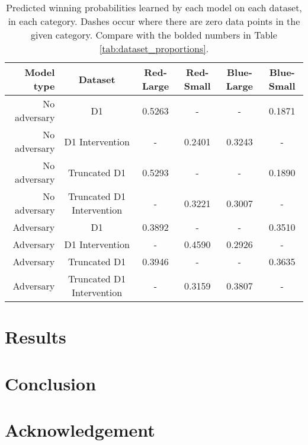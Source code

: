 \documentclass{article}
\begin{document}
\begin{table*} %
\centering
\begin{tabular}{r | c | c | c | c | c}
 Model type & Dataset & Red-Large & Red-Small & Blue-Large & Blue-Small \\
 \hline
No adversary & D1 & 0.5263 & - & - & 0.1871 \\
No adversary  & D1 Intervention & - & 0.2401 & 0.3243 & - \\
No adversary  & Truncated D1 & 0.5293 & - & - & 0.1890 \\
No adversary  & Truncated D1 Intervention & - & 0.3221 & 0.3007 & - \\
\hline
Adversary & D1 & 0.3892 & - & - & 0.3510 \\
Adversary  & D1 Intervention & - & 0.4590 & 0.2926 & - \\
Adversary  & Truncated D1 & 0.3946 & - & - & 0.3635 \\
Adversary  & Truncated D1 Intervention & - & 0.3159 & 0.3807 & -
\end{tabular}
\caption{Predicted winning probabilities learned by each model on each dataset, in each category. Dashes occur where there are zero data points in the given category. Compare with the bolded numbers in Table \ref{tab:dataset_proportions}.}
\label{tab:model_performance}
\end{table*}



\section{Results}










\section{Conclusion}








\section{Acknowledgement}














\end{document}
